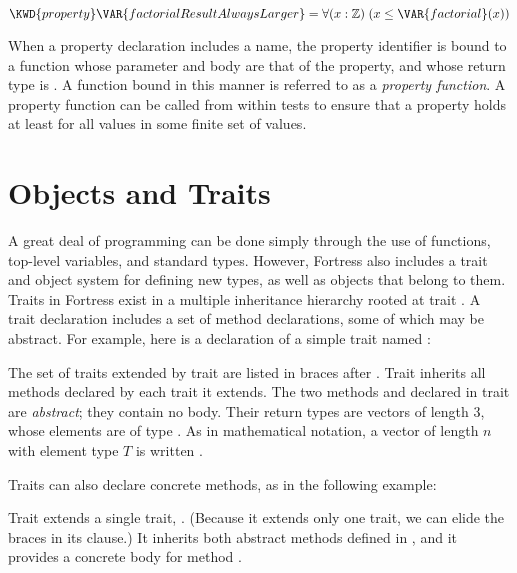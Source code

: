 \begin{Fortress}
\(\KWD{property} \VAR{factorialResultAlwaysLarger} = \forall (x \mathrel{\mathtt{:}} \mathbb{Z})\; (x \leq \VAR{factorial}(x))\)
\end{Fortress}

When a property declaration includes a name, the property identifier is bound to a function whose parameter and body are that of the property,
and whose return type is .
A function bound in this manner is referred to as a \emph{property function}.
A property function can be called from within tests to ensure that a
property holds at least for all values in some finite set of values.

\section{Objects and Traits}

A great deal of programming can be done simply through the use of
functions, top-level
variables, and standard types. However, Fortress also includes a trait and object system for
defining new types, as well as objects that belong to them. Traits in Fortress exist in
a multiple inheritance hierarchy rooted at trait .
A trait declaration includes a set of method declarations,
some of which may be abstract.
For example, here is a declaration of a simple trait named :

\label{movingDim}


The set of traits extended by trait  are listed in braces after
. Trait  inherits all
methods declared by each trait it extends.
The two methods  and  declared in trait 
are \emph{abstract}; they contain no body.
Their return types are vectors of length 3, whose elements are
of type .
As in mathematical notation,
a vector of length $n$ with element type $T$ is written
.

Traits can also declare concrete methods,
as in the following example:

\label{fastDim}


Trait  extends a single trait, . (Because it extends
only one trait, we can elide the braces in its  clause.)
It inherits both abstract methods defined in , and it provides
a concrete body for method .

